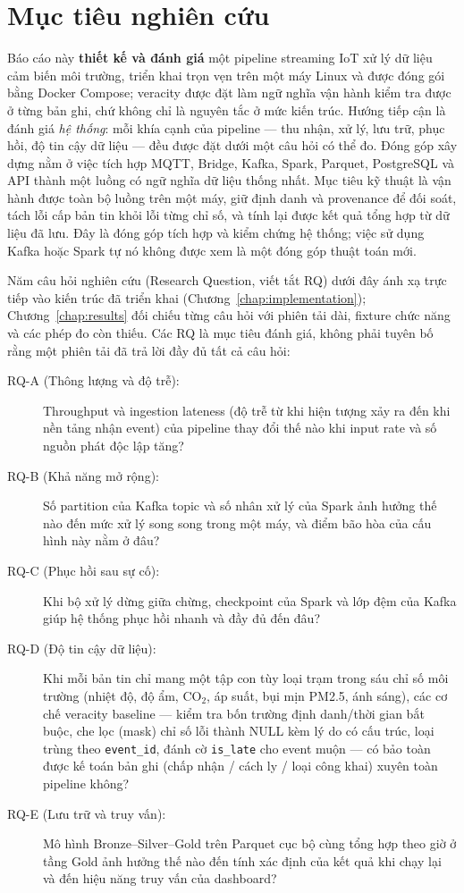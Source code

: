 \section{Mục tiêu nghiên cứu}

Báo cáo này \textbf{thiết kế và đánh giá} một pipeline streaming IoT xử lý
dữ liệu cảm biến môi trường, triển khai trọn vẹn trên một máy Linux và được
đóng gói bằng Docker Compose; veracity được đặt làm ngữ nghĩa vận hành kiểm
tra được ở từng bản ghi, chứ không chỉ là nguyên tắc ở mức kiến trúc. Hướng
tiếp cận là đánh giá \emph{hệ thống}: mỗi khía cạnh của pipeline --- thu
nhận, xử lý, lưu trữ, phục hồi, độ tin cậy dữ liệu --- đều được đặt dưới
một câu hỏi có thể đo. Đóng góp xây dựng nằm ở việc tích hợp MQTT, Bridge, Kafka, Spark,
Parquet, PostgreSQL và API thành một luồng có ngữ nghĩa dữ liệu thống nhất.
Mục tiêu kỹ thuật là vận hành được toàn bộ luồng trên một máy, giữ định
danh và provenance để đối soát, tách lỗi cấp bản tin khỏi lỗi từng chỉ số,
và tính lại được kết quả tổng hợp từ dữ liệu đã lưu. Đây là đóng góp tích
hợp và kiểm chứng hệ thống; việc sử dụng Kafka hoặc Spark tự nó không
được xem là một đóng góp thuật toán mới.

Năm câu hỏi nghiên cứu
(Research Question, viết tắt RQ) dưới đây ánh xạ trực tiếp vào kiến trúc đã
triển khai (Chương~\ref{chap:implementation}); Chương~\ref{chap:results}
đối chiếu từng câu hỏi với phiên tải dài, fixture chức năng và các phép
đo còn thiếu. Các RQ là mục tiêu đánh giá, không phải tuyên bố rằng một
phiên tải đã trả lời đầy đủ tất cả câu hỏi:

\begin{description}
  \item[RQ-A (Thông lượng và độ trễ):] Throughput và ingestion lateness
        (độ trễ từ khi hiện tượng xảy ra đến khi nền tảng nhận event)
        của pipeline thay đổi thế nào khi input rate và số nguồn phát
        độc lập tăng?
  \item[RQ-B (Khả năng mở rộng):] Số partition của Kafka topic và số nhân
        xử lý của Spark ảnh hưởng thế nào đến mức xử lý song song trong
        một máy, và điểm bão hòa của cấu hình này nằm ở đâu?
  \item[RQ-C (Phục hồi sau sự cố):] Khi bộ xử lý dừng giữa chừng, checkpoint
        của Spark và lớp đệm của Kafka giúp hệ thống phục hồi nhanh và
        đầy đủ đến đâu?
  \item[RQ-D (Độ tin cậy dữ liệu):] Khi mỗi bản tin chỉ mang một tập con
        tùy loại trạm trong sáu chỉ số môi trường (nhiệt độ, độ ẩm,
        CO$_2$, áp suất, bụi mịn PM2.5, ánh sáng), các cơ chế veracity
        baseline --- kiểm tra bốn trường định danh/thời gian bắt buộc, che
        lọc (mask) chỉ số lỗi thành NULL kèm lý do có cấu trúc, loại trùng
        theo \texttt{event\_id}, đánh cờ \texttt{is\_late} cho event muộn
        --- có bảo toàn được kế toán bản ghi (chấp nhận / cách ly / loại
        công khai) xuyên toàn pipeline không?
  \item[RQ-E (Lưu trữ và truy vấn):] Mô hình Bronze--Silver--Gold trên
        Parquet cục bộ cùng tổng hợp theo giờ ở tầng Gold ảnh hưởng thế nào
        đến tính xác định của kết quả khi chạy lại và đến hiệu năng truy
        vấn của dashboard?
\end{description}

